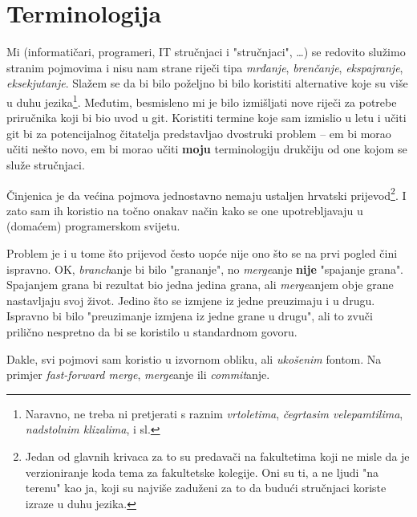 \chapter*{Terminologija}

Mi (informatičari, programeri, IT stručnjaci i "stručnjaci", \dots) se redovito služimo stranim pojmovima i nisu nam strane riječi tipa \emph{mrđanje}, \emph{brenčanje}, \emph{ekspajranje}, \emph{eksekjutanje}.
Slažem se da bi bilo poželjno bi bilo koristiti alternative koje su više u duhu jezika\footnote{Naravno, ne treba ni pretjerati s raznim \emph{vrtoletima}, \emph{čegrtasim velepamtilima}, \emph{nadstolnim klizalima}, i sl.}.
Međutim, besmisleno mi je bilo izmišljati nove riječi za potrebe priručnika koji bi bio uvod u git.
Koristiti termine koje sam izmislio u letu i učiti git bi za potencijalnog čitatelja predstavljao dvostruki problem -- em bi morao učiti nešto novo, em bi morao učiti \textbf{moju} terminologiju drukčiju od one kojom se služe stručnjaci.

Činjenica je da većina pojmova jednostavno nemaju ustaljen hrvatski prijevod\footnote{Jedan od glavnih krivaca za to su predavači na fakultetima koji ne misle da je verzioniranje koda tema za fakultetske kolegije. Oni su ti, a ne ljudi "na terenu" kao ja, koji su najviše zaduženi za to da budući stručnjaci koriste izraze u duhu jezika.}. 
I zato sam ih koristio na točno onakav način kako se one upotrebljavaju u (domaćem) programerskom svijetu.

Problem je i u tome što prijevod često uopće nije ono što se na prvi pogled čini ispravno.
OK, \emph{branch}anje bi bilo "grananje", no \emph{merge}anje \textbf{nije} "spajanje grana". 
Spajanjem grana bi rezultat bio jedna jedina grana, ali \emph{merge}anjem obje grane nastavljaju svoj život. 
Jedino što se izmjene iz jedne preuzimaju i u drugu. 
Ispravno bi bilo "preuzimanje izmjena iz jedne grane u drugu", ali to zvuči prilično nespretno da bi se koristilo u standardnom govoru.

Dakle, svi pojmovi sam koristio u izvornom obliku, ali \emph{ukošenim} fontom. Na primjer \emph{fast-forward merge}, \emph{merge}anje ili \emph{commit}anje.


